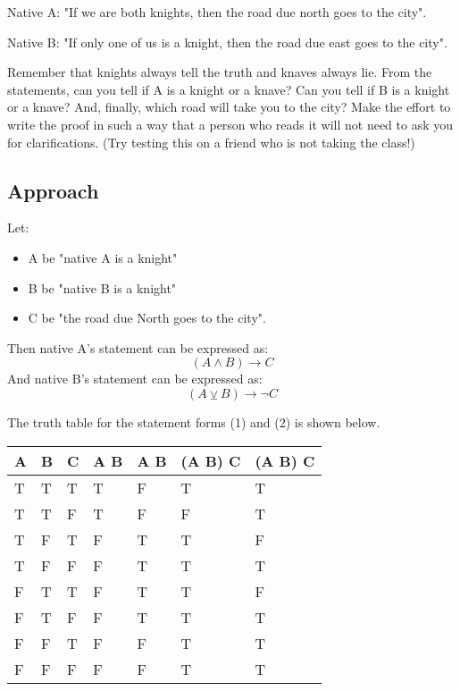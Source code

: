 \documentclass{article}
\begin{document}
Native A: "If we are both knights, then the road due north goes to the city".

Native B: "If only one of us is a knight, then the road due east goes to the city".

Remember that knights always tell the truth and knaves always lie. From the statements, can you tell if A is a knight or a knave? Can you tell if B is a knight or a knave? And, finally, which road will take you to the city?
Make the effort to write the proof in such a way that a person who reads it will not need to ask you for clarifications. (Try testing this on a friend who is not taking the class!)

\subsection{Approach}
Let:
\begin{itemize}[noitemsep, nolistsep]
	\item A be "native A is a knight"
	\item B be "native B is a knight"
	\item C be "the road due North goes to the city". 
\end{itemize}

Then native A's statement can be expressed as: 
\begin{equation}
	(A \land B) \rightarrow C
\end{equation}
And native B's statement can be expressed as:
\begin{equation}
	(A \veebar B) \rightarrow \lnot C
\end{equation}

The truth table for the statement forms (1) and (2) is shown below.

\begin{center}
	\begin{tabular}{ L L L | L | L | L | L }
		A & B & C & A \land B & A \veebar B & (A \land B) \rightarrow C & (A \land B) \rightarrow C \\
		\hline
		T & T & T & T & F & T & T \\ 
		T & T & F & T & F & F & T \\  
		T & F & T & F & T & T & F \\
		T & F & F & F & T & T & T \\
		F & T & T & F & T & T & F \\ 
		F & T & F & F & T & T & T \\  
		F & F & T & F & F & T & T \\
		F & F & F & F & F & T & T 
	\end{tabular}
\end{center}
\end{document}
